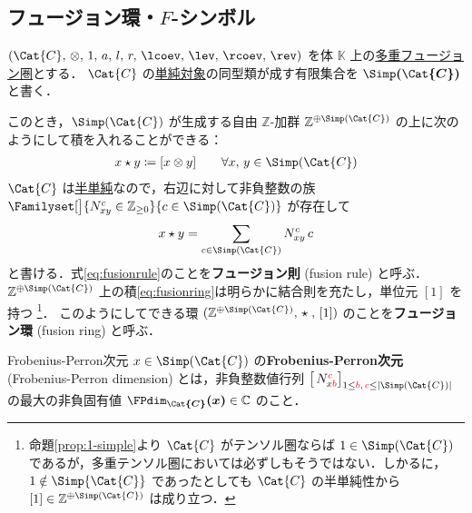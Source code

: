 \documentclass[TQFT_main]{subfiles}
\begin{document}
\subsection{フュージョン環・$F$-シンボル}

$(\Cat{C},\, \otimes,\, 1,\, a,\, l,\, r,\, \lcoev,\, \lev,\, \rcoev,\, \rev)$ を体 $\mathbb{K}$ 上の\hyperref[def:tensorfusion-cat]{多重フュージョン圏}とする．
$\Cat{C}$ の\hyperref[def:semisimple-cat]{単純対象}の同型類が成す有限集合を $\bm{\Simp (\Cat{C})}$ と書く．

このとき，$\Simp(\Cat{C})$ が生成する自由 $\mathbb{Z}$-加群 $\mathbb{Z}^{\oplus \Simp(\Cat{C})}$ の上に次のようにして積を入れることができる：
\begin{align}
    \label{eq:fusionring}
    x \star y \coloneqq [x \otimes y]\qquad \forall x,\, y \in \Simp(\Cat{C})
\end{align}
$\Cat{C}$ は\hyperref[def:semisimple-cat]{半単純}なので，右辺に対して非負整数の族 $\Familyset[\big]{N^c_{xy} \in \mathbb{Z}_{\ge 0}}{c \in \Simp(\Cat{C})}$ が存在して
\begin{align}
    \label{eq:fusionrule}
    x \star y = \sum_{c \in \Simp(\Cat{C})} N^c_{xy}\, c
\end{align}
と書ける．式\eqref{eq:fusionrule}のことを\textbf{フュージョン則} (fusion rule) と呼ぶ．
$\mathbb{Z}^{\oplus \Simp(\Cat{C})}$ 上の積\eqref{eq:fusionring}は明らかに結合則を充たし，単位元 $[1]$ を持つ
\footnote{命題\ref{prop:1-simple}より $\Cat{C}$ がテンソル圏ならば $1 \in \Simp(\Cat{C})$ であるが，多重テンソル圏においては必ずしもそうではない．しかるに，$1 \notin \Simp{\Cat{C}}$ であったとしても $\Cat{C}$ の半単純性から $[1] \in \mathbb{Z}^{\oplus \Simp(\Cat{C})}$ は成り立つ．}．
このようにしてできる環 $(\mathbb{Z}^{\oplus \Simp(\Cat{C})},\, \star\; ,\, [1])$ のことを\textbf{フュージョン環} (fusion ring) と呼ぶ．

\begin{mydef}[label=def:FPdim]{Frobenius-Perron次元}
    $x \in \Simp(\Cat{C})$ の\textbf{Frobenius-Perron次元} (Frobenius-Perron dimension) とは，非負整数値行列 $\bigl[\, N^{\textcolor{red}{c}}_{x \textcolor{red}{b}} \bigr]_{1 \le \textcolor{red}{b},\, \textcolor{red}{c} \le \abs{\Simp(\Cat{C})}}$ の最大の非負固有値 $\bm{\FPdim_{\Cat{C}} (x)} \in \mathbb{C}$ のこと．
\end{mydef}
\end{document}
